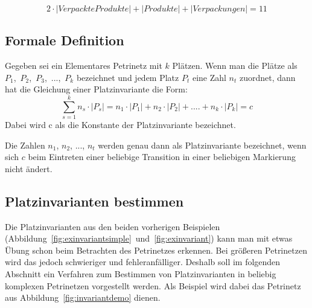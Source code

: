 		$$2\cdot|Verpackte Produkte| + |Produkte| + |Verpackungen| = 11$$

	\subsection{Formale Definition}
	\label{sub:formale_definition}
		Gegeben sei ein Elementares Petrinetz mit $k$ Plätzen. Wenn man die Plätze als $P_1$,~$P_2$,~$P_3$,~...,~$P_k$ bezeichnet und jedem Platz $P_t$ eine Zahl $n_t$ zuordnet, dann hat die Gleichung einer Platzinvariante die Form:
		$$
		\sum_{s=1}^k n_s \cdot |P_s| = n_1 \cdot |P_1| + n_2 \cdot |P_2| + .... + n_k \cdot |P_k| = c
		$$
		Dabei wird c als die Konstante der Platzinvariante bezeichnet. 

		Die Zahlen $n_1$, $n_2$, ..., $n_t$ werden genau dann als Platzinvariante bezeichnet, wenn sich $c$ beim Eintreten einer beliebige Transition in einer beliebigen Markierung nicht ändert.

	\subsection{Platzinvarianten bestimmen}
		Die Platzinvarianten aus den beiden vorherigen Beispielen (Abbildung~\ref{fig:exinvariantsimple}~und~\ref{fig:exinvariant}) kann man mit etwas Übung schon beim Betrachten des Petrinetzes erkennen. Bei größeren Petrinetzen wird das jedoch schwieriger und fehleranfälliger. Deshalb soll im folgenden Abschnitt ein Verfahren zum Bestimmen von Platzinvarianten in beliebig komplexen Petrinetzen vorgestellt werden. Als Beispiel wird dabei das Petrinetz aus Abbildung~\ref{fig:invariantdemo} dienen.


